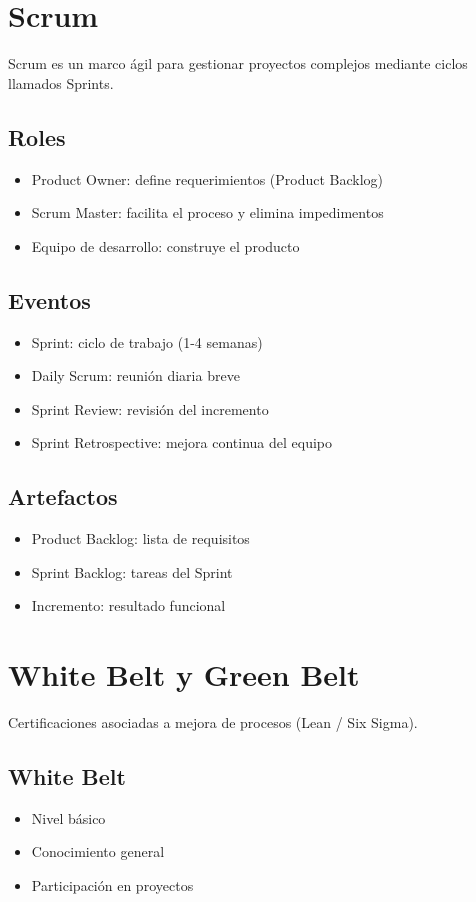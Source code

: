\documentclass{llncs}
\begin{document}
\section{Scrum}
Scrum es un marco ágil para gestionar proyectos complejos mediante ciclos llamados Sprints.

\subsection{Roles}
\begin{itemize}
\item Product Owner: define requerimientos (Product Backlog)
\item Scrum Master: facilita el proceso y elimina impedimentos
\item Equipo de desarrollo: construye el producto
\end{itemize}

\subsection{Eventos}
\begin{itemize}
\item Sprint: ciclo de trabajo (1-4 semanas)
\item Daily Scrum: reunión diaria breve
\item Sprint Review: revisión del incremento
\item Sprint Retrospective: mejora continua del equipo
\end{itemize}

\subsection{Artefactos}
\begin{itemize}
\item Product Backlog: lista de requisitos
\item Sprint Backlog: tareas del Sprint
\item Incremento: resultado funcional
\end{itemize}

\section{White Belt y Green Belt}
Certificaciones asociadas a mejora de procesos (Lean / Six Sigma).

\subsection{White Belt}
\begin{itemize}
\item Nivel básico
\item Conocimiento general
\item Participación en proyectos
\end{itemize}
\end{document}
